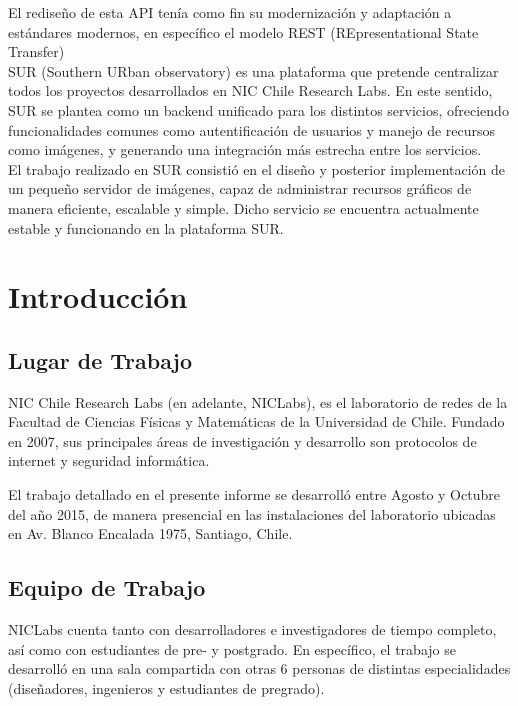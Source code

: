 \documentclass[11pt,letterpaper]{article}
\begin{document}
El rediseño de esta API tenía como fin su modernización y adaptación a estándares modernos, en específico el modelo REST (REpresentational State Transfer)\\

SUR (Southern URban observatory) es una plataforma que pretende centralizar todos los proyectos desarrollados en NIC Chile Research Labs. En este sentido, SUR se plantea como un backend unificado para los distintos servicios, ofreciendo funcionalidades comunes como autentificación de usuarios y manejo de recursos como imágenes, y generando una integración más estrecha entre los servicios.\\

El trabajo realizado en SUR consistió en el diseño y posterior implementación de un pequeño servidor de imágenes, capaz de administrar recursos gráficos de manera eficiente, escalable y simple. Dicho servicio se encuentra actualmente estable y funcionando en la plataforma SUR.
\newpage
\section{Introducción}
\subsection{Lugar de Trabajo}

NIC Chile Research Labs (en adelante, NICLabs)\cite{niclabs}, es el laboratorio de redes de la Facultad de Ciencias Físicas y Matemáticas de la Universidad de Chile. Fundado en 2007, sus principales áreas de investigación y desarrollo son protocolos de internet y seguridad informática.

El trabajo detallado en el presente informe se desarrolló entre Agosto y Octubre del año 2015, de manera presencial en las instalaciones del laboratorio ubicadas en Av. Blanco Encalada 1975, Santiago, Chile.

\subsection{Equipo de Trabajo}


NICLabs cuenta tanto con desarrolladores e investigadores de tiempo completo, así como con estudiantes de pre- y postgrado. En específico, el trabajo se desarrolló en una sala compartida con otras 6 personas de distintas especialidades (diseñadores, ingenieros y estudiantes de pregrado).
\end{document}
